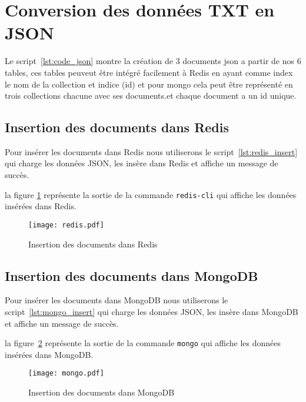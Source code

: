 \section{Conversion des données TXT en JSON}

Le script~\ref{lst:code_json} montre la création de 3 documents json a partir de nos 6 tables, ces tables peuveut être intégré facilement à Redis en ayant comme index le nom de la collection et indice (id) et pour mongo cela peut être représenté en trois collections chacune avec ses documents.\@ et chaque document a un id unique.

\subsection{Insertion des documents dans Redis}

Pour insérer les documents dans Redis nous utiliserons le script~\ref{lst:redis_insert} qui charge les données JSON, les insère dans Redis et affiche un message de succès.

la figure \ref{fig:redis_insert} représente la sortie de la commande \texttt{redis-cli} qui affiche les données insérées dans Redis.

\begin{figure}[H]
  \centering
  \texttt{[image: redis.pdf]}
  \caption{Insertion des documents dans Redis}
  \label{fig:redis_insert}
\end{figure}

\subsection{Insertion des documents dans MongoDB}

Pour insérer les documents dans MongoDB nous utiliserons le script~\ref{lst:mongo_insert} qui charge les données JSON, les insère dans MongoDB et affiche un message de succès.

la figure~\ref{fig:mongo_insert} représente la sortie de la commande \texttt{mongo} qui affiche les données insérées dans MongoDB.\@

\begin{figure}[H]
  \centering
  \texttt{[image: mongo.pdf]}
  \caption{Insertion des documents dans MongoDB}
  \label{fig:mongo_insert}
\end{figure}